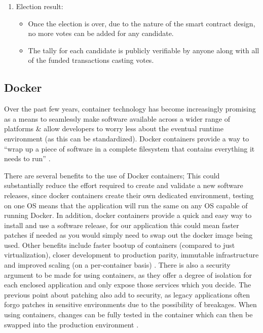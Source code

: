 \documentclass{article}
\begin{document}
\begin{enumerate}
\item Election result:
	\begin{itemize}
		\item Once the election is over, due to the nature of the smart contract design, no more votes can be added for any candidate.
		\item The tally for each candidate is publicly verifiable by anyone along with all of the funded transactions casting votes.
	\end{itemize}

\end{enumerate}

\cleardoublepage    
\subsection{Docker}
Over the past few years, container technology has become increasingly promising as a means to seamlessly make software available across a wider range of platforms \& allow developers to worry less about the eventual runtime environment (as this can be standardized). Docker containers provide a way to ``wrap up a piece of software in a complete filesystem that contains everything it needs to run'' \citep{51_kowalkowski_2017}.

There are several benefits to the use of Docker containers; This could substantially reduce the effort required to create and validate a new software releases, since docker containers create their own dedicated environment, testing on one OS means that the application will run the same on any OS capable of running Docker. In addition, docker containers provide a quick and easy way to install and use a software release, for our application this could mean faster patches if needed as you would simply need to swap out the docker image being used. Other benefits include faster bootup of containers (compared to just virtualization), closer development to production parity, immutable infrastructure and improved scaling (on a per-container basis) \citep{52_scherensstraat_2017}. There is also a security argument to be made for using containers, as they offer a degree of isolation for each enclosed application and only expose those services which you decide. The previous point about patching also add to security, as legacy applications often forgo patches in sensitive environments due to the possibility of breakages. When using containers, changes can be fully tested in the container which can then be swapped into the production environment \citep{53_security_risks_and_benefits_of_docker_application_containers_2017}.
\end{document}
